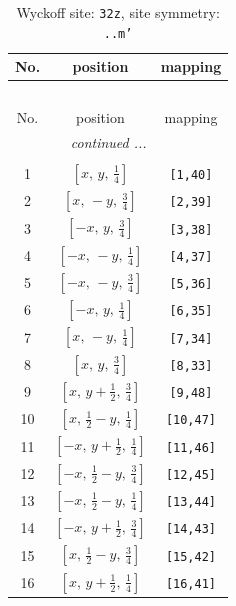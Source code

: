 \documentclass[fleqn,8pt]{jsarticle}
\begin{document}
\begin{longtable}{ccc}
\caption{Wyckoff site: {\tt 32z}, site symmetry: {\tt ..m'}}
 \\
 \hline \hline
No. & position & mapping \\ \hline \endfirsthead

\multicolumn{2}{l}{\tablename\ \thetable{}} \\
 \hline \hline
No. & position & mapping \\ \hline \endhead

 \hline \hline
\multicolumn{2}{r}{\footnotesize\it continued ...} \\ \endfoot

 \hline \hline
\multicolumn{2}{r}{} \\ \endlastfoot

1 & $\left[ x,\, y,\, \frac{1}{4} \right]$ & {\tt [1,40]} \\ \hline
2 & $\left[ x,\, - y,\, \frac{3}{4} \right]$ & {\tt [2,39]} \\ \hline
3 & $\left[ - x,\, y,\, \frac{3}{4} \right]$ & {\tt [3,38]} \\ \hline
4 & $\left[ - x,\, - y,\, \frac{1}{4} \right]$ & {\tt [4,37]} \\ \hline
5 & $\left[ - x,\, - y,\, \frac{3}{4} \right]$ & {\tt [5,36]} \\ \hline
6 & $\left[ - x,\, y,\, \frac{1}{4} \right]$ & {\tt [6,35]} \\ \hline
7 & $\left[ x,\, - y,\, \frac{1}{4} \right]$ & {\tt [7,34]} \\ \hline
8 & $\left[ x,\, y,\, \frac{3}{4} \right]$ & {\tt [8,33]} \\ \hline
9 & $\left[ x,\, y + \frac{1}{2},\, \frac{3}{4} \right]$ & {\tt [9,48]} \\ \hline
10 & $\left[ x,\, \frac{1}{2} - y,\, \frac{1}{4} \right]$ & {\tt [10,47]} \\ \hline
11 & $\left[ - x,\, y + \frac{1}{2},\, \frac{1}{4} \right]$ & {\tt [11,46]} \\ \hline
12 & $\left[ - x,\, \frac{1}{2} - y,\, \frac{3}{4} \right]$ & {\tt [12,45]} \\ \hline
13 & $\left[ - x,\, \frac{1}{2} - y,\, \frac{1}{4} \right]$ & {\tt [13,44]} \\ \hline
14 & $\left[ - x,\, y + \frac{1}{2},\, \frac{3}{4} \right]$ & {\tt [14,43]} \\ \hline
15 & $\left[ x,\, \frac{1}{2} - y,\, \frac{3}{4} \right]$ & {\tt [15,42]} \\ \hline
16 & $\left[ x,\, y + \frac{1}{2},\, \frac{1}{4} \right]$ & {\tt [16,41]} \\ \hline

\end{longtable}
\end{document}
